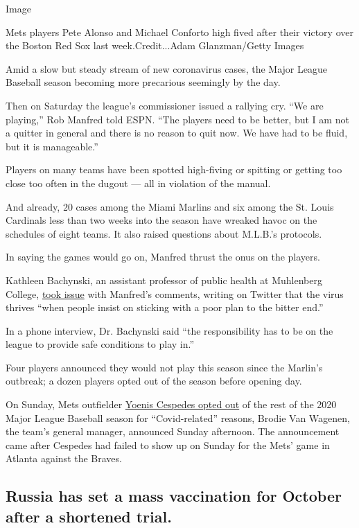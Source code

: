 Image

Mets players Pete Alonso and Michael Conforto high fived after their
victory over the Boston Red Sox last week.Credit...Adam Glanzman/Getty
Images

Amid a slow but steady stream of new coronavirus cases, the Major League
Baseball season becoming more precarious seemingly by the day.

Then on Saturday the league's commissioner issued a rallying cry. ``We
are playing,'' Rob Manfred told ESPN. ``The players need to be better,
but I am not a quitter in general and there is no reason to quit now. We
have had to be fluid, but it is manageable.''

Players on many teams have been spotted high-fiving or spitting or
getting too close too often in the dugout --- all in violation of the
manual.

And already, 20 cases among the Miami Marlins and six among the St.
Louis Cardinals less than two weeks into the season have wreaked havoc
on the schedules of eight teams. It also raised questions about M.L.B.'s
protocols.

In saying the games would go on, Manfred thrust the onus on the players.

Kathleen Bachynski, an assistant professor of public health at
Muhlenberg College,
\href{https://twitter.com/bachyns/status/1289665507117772800}{took
issue} with Manfred's comments, writing on Twitter that the virus
thrives ``when people insist on sticking with a poor plan to the bitter
end.''

In a phone interview, Dr. Bachynski said ``the responsibility has to be
on the league to provide safe conditions to play in.''

Four players announced they would not play this season since the
Marlin's outbreak; a dozen players opted out of the season before
opening day.

On Sunday, Mets outfielder
\href{https://www.nytimes3xbfgragh.onion/2020/08/02/sports/baseball/Yoenis-cespedes-opt-out-rule.html}{Yoenis
Cespedes opted out} of the rest of the 2020 Major League Baseball season
for ``Covid-related'' reasons, Brodie Van Wagenen, the team's general
manager, announced Sunday afternoon. The announcement came after
Cespedes had failed to show up on Sunday for the Mets' game in Atlanta
against the Braves.

\hypertarget{russia-has-set-a-mass-vaccination-for-october-after-a-shortened-trial}{%
\subsection{Russia has set a mass vaccination for October after a
shortened
trial.}\label{russia-has-set-a-mass-vaccination-for-october-after-a-shortened-trial}}

